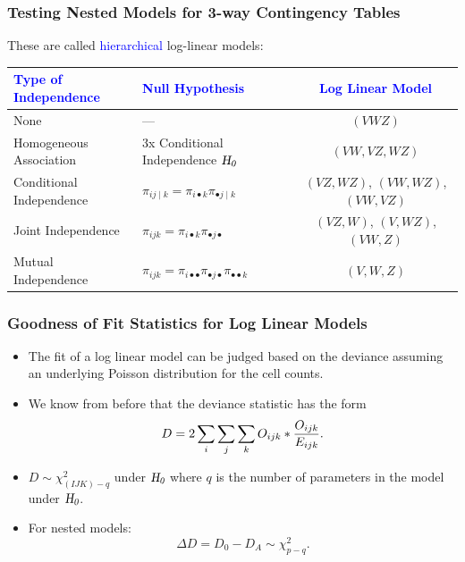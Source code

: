 \documentclass[oneside]{book}\usepackage[]{graphicx}\usepackage[svgnames]{xcolor}
\let\log\relax%
\newcommand{\HN}{\textsl{H}_{\textsl{0}}}%
\begin{document}
\subsubsection*{Testing Nested Models for 3-way Contingency Tables}
These are called \textcolor{Blue}{hierarchical} log-linear models:
\begin{table}[H]
      \centering
      \begin{tabular}{llc}
            \textcolor{Blue}{Type of Independence} & \textcolor{Blue}{Null Hypothesis}                                               & \textcolor{Blue}{Log Linear Model}    \\
            \midrule
            None                                   & ---                                                                             & $ (VWZ) $                             \\
            Homogeneous Association                & 3x Conditional Independence $ \HN $                                             & $ (VW,VZ,WZ) $                        \\
            Conditional Independence               & $ \pi_{ij\mid k}=\pi_{i\bullet k}\pi_{\bullet j\mid k} $                        & $ (VZ,WZ) $, $ (VW,WZ) $, $ (VW,VZ) $ \\
            Joint Independence                     & $ \pi_{ijk}=\pi_{i\bullet k}\pi_{\bullet j\bullet} $                            & $ (VZ,W) $, $ (V,WZ) $, $ (VW,Z) $    \\
            Mutual Independence                    & $ \pi_{ijk}=\pi_{i\bullet\bullet}\pi_{\bullet j\bullet}\pi_{\bullet\bullet k} $ & $ (V,W,Z) $                           \\
            \bottomrule
      \end{tabular}
\end{table}
\subsubsection*{Goodness of Fit Statistics for Log Linear Models}
\begin{itemize}
      \item The fit of a log linear model can be judged based on the deviance assuming an
            underlying Poisson distribution for the cell counts.
      \item We know from before that the deviance statistic has the form
            \[ D=2\sum_i\sum_j\sum_k O_{ijk}\log*{\frac{O_{ijk}}{E_{ijk}}}. \]
      \item $ D \sim \chi^2_{(IJK)-q} $ under $ \HN $ where $ q $ is the number of parameters in the model under $ \HN $.
      \item For nested models:
            \[ \Delta D=D_0-D_A \sim \chi^2_{p-q}. \]
\end{itemize}
\end{document}

